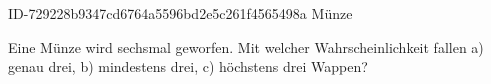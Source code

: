 \begin{exercise}
      {ID-729228b9347cd6764a5596bd2e5c261f4565498a}
      {Münze}
  \ifproblem\problem\par
    Eine Münze wird sechsmal geworfen. Mit welcher Wahrscheinlichkeit fallen
    a) genau drei,
    b) mindestens drei,
    c) höchstens drei
    Wappen?
  \fi
\end{exercise}
